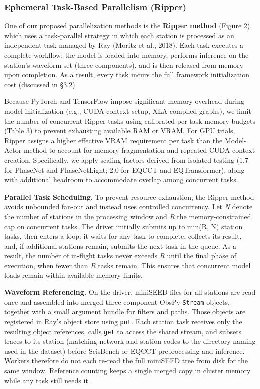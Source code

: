 \subsubsection{Ephemeral Task-Based Parallelism (Ripper)}

One of our proposed parallelization methods is the \textbf{Ripper method} (Figure 2), which uses a task-parallel strategy in which each station is processed as an independent task managed by Ray (Moritz et al., 2018). Each task executes a complete workflow: the model is loaded into memory, performs inference on the station’s waveform set (three components), and is then released from memory upon completion. As a result, every task incurs the full framework initialization cost (discussed in \S3.2).

Because PyTorch and TensorFlow impose significant memory overhead during model initialization (e.g., CUDA context setup, XLA-compiled graphs), we limit the number of concurrent Ripper tasks using calibrated per-task memory budgets (Table 3) to prevent exhausting available RAM or VRAM. For GPU trials, Ripper assigns a higher effective VRAM requirement per task than the Model-Actor method to account for memory fragmentation and repeated CUDA context creation. Specifically, we apply scaling factors derived from isolated testing (1.7 for PhaseNet and PhaseNetLight; 2.0 for EQCCT and EQTransformer), along with additional headroom to accommodate overlap among concurrent tasks.

\textbf{Parallel Task Scheduling.} To prevent resource exhaustion, the Ripper method avoids unbounded fan-out and instead uses controlled concurrency. Let \emph{N} denote the number of stations in the processing window and \emph{R} the memory-constrained cap on concurrent tasks. The driver initially submits up to min(R, N) station tasks, then enters a loop: it waits for any task to complete, collects its result, and, if additional stations remain, submits the next task in the queue. As a result, the number of in-flight tasks never exceeds \emph{R} until the final phase of execution, when fewer than \emph{R} tasks remain. This ensures that concurrent model loads remain within available memory limits.

\textbf{Waveform Referencing.} On the driver, miniSEED files for all stations are read once and assembled into merged three-component ObsPy \texttt{Stream} objects, together with a small argument bundle for filters and paths. Those objects are registered in Ray’s object store using \texttt{put}. Each station task receives only the resulting object references, calls \texttt{get} to access the shared stream, and subsets traces to its station (matching network and station codes to the directory naming used in the dataset) before SeisBench or EQCCT preprocessing and inference. Workers therefore do not each re-read the full miniSEED tree from disk for the same window. Reference counting keeps a single merged copy in cluster memory while any task still needs it.

